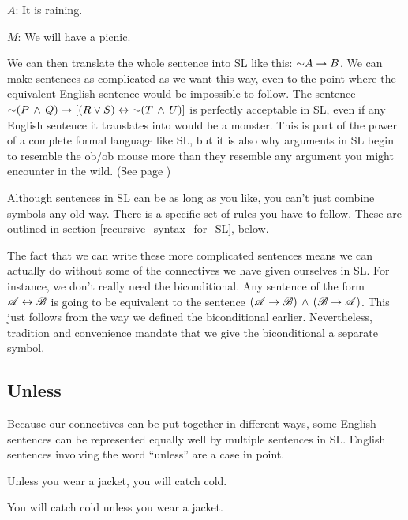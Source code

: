 \begin{ekey}
\item[$A$:] It is raining.
\item[$M$:] We will have a picnic.
\end{ekey}

We can then translate the whole sentence into SL like this: $\mathord{\sim} A \rightarrow B$. We can make sentences as complicated as we want this way, even to the point where the equivalent English sentence would be impossible to follow. The sentence $\mathord{\sim} (P \,\land\, Q) \rightarrow  [(R \lor S) \leftrightarrow \mathord{\sim} (T \,\land\, U)]$ is perfectly acceptable in SL, even if any English sentence it translates into would be a monster. This is part of the power of a complete formal language like SL, but it is also why arguments in SL begin to resemble the ob/ob mouse more than they resemble any argument you might encounter in the wild. (See page \pageref{fig:ob_ob_mouse})

Although sentences in SL can be as long as you like, you can't just combine symbols any old way. There is a specific set of rules you have to follow. These are outlined in section \ref{recursive_syntax_for_SL}, below.

The fact that we can write these more complicated sentences means we can actually do without some of the connectives we have given ourselves in SL. For instance, we don't really need the biconditional. Any sentence of the form $\mathscr{A} \leftrightarrow \mathscr{B}$ is going to be equivalent to the sentence $(\mathscr{A} \rightarrow \mathscr{B}) \,\land\, (\mathscr{B} \rightarrow \mathscr{A})$. This just follows from the way we defined the biconditional earlier. Nevertheless, tradition and convenience mandate that we give the biconditional a separate symbol.

\subsection{Unless}

Because our connectives can be put together in different ways, some English sentences can be represented equally well by multiple sentences in SL. English sentences involving the word ``unless'' are a case in point.

\begin{earg}
\item[\ex{unless1}] Unless you wear a jacket, you will catch cold.
\item[\ex{unless2}] You will catch cold unless you wear a jacket.
\end{earg}

